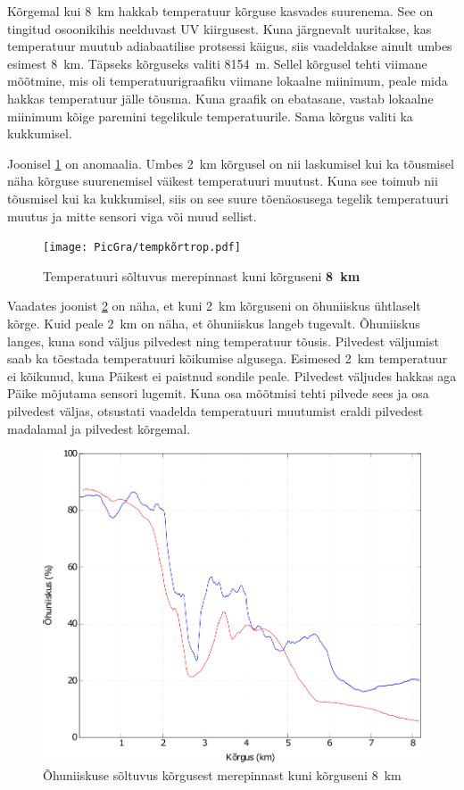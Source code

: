 \documentclass{trkut}%
\begin{document}
Kõrgemal kui \SI{8}{km} hakkab temperatuur kõrguse kasvades suurenema. See on tingitud osoonikihis neelduvast UV kiirgusest. Kuna järgnevalt uuritakse, kas temperatuur muutub adiabaatilise protsessi käigus, siis vaadeldakse ainult umbes esimest \SI{8}{km}. Täpseks kõrguseks valiti \SI{8154}{m}. Sellel kõrgusel tehti viimane mõõtmine, mis oli temperatuurigraafiku viimane lokaalne miinimum, peale mida hakkas temperatuur jälle tõusma. Kuna graafik on ebatasane, vastab lokaalne miinimum kõige paremini tegelikule temperatuurile. Sama kõrgus valiti ka kukkumisel.

Joonisel \ref{tempkõrtrop} on anomaalia. Umbes \SI{2}{km} kõrgusel on nii laskumisel kui ka tõusmisel näha kõrguse suurenemisel väikest temperatuuri muutust. Kuna see toimub nii tõusmisel kui ka kukkumisel, siis on see suure tõenäosusega tegelik temperatuuri muutus ja mitte sensori viga või muud sellist.
\begin{figure}[h]
	\texttt{[image: PicGra/tempkõrtrop.pdf]}
	\caption{Temperatuuri sõltuvus merepinnast kuni kõrguseni \textbf{\SI{8}{km}}}
	\label{tempkõrtrop}%
\end{figure}

Vaadates joonist \ref{humkõrtrop} on näha, et kuni \SI{2}{km} kõrguseni on õhuniiskus ühtlaselt kõrge. Kuid peale \SI{2}{km} on näha, et õhuniiskus langeb tugevalt. Õhuniiskus langes, kuna sond väljus pilvedest ning temperatuur tõusis. Pilvedest väljumist saab ka tõestada temperatuuri kõikumise algusega. Esimesed \SI{2}{km} temperatuur ei kõikunud, kuna Päikest ei paistnud sondile peale. Pilvedest väljudes hakkas aga Päike mõjutama sensori lugemit. Kuna osa mõõtmisi tehti pilvede sees ja osa pilvedest väljas, otsustati vaadelda temperatuuri muutumist eraldi pilvedest madalamal ja pilvedest kõrgemal.
\begin{figure}[h]
	\includegraphics[width=1\textwidth]{PicGra/humkõrtrop.pdf}
	\caption{Õhuniiskuse sõltuvus kõrgusest merepinnast kuni kõrguseni \SI{8}{km}}
	\label{humkõrtrop}%
\end{figure}
\end{document}
